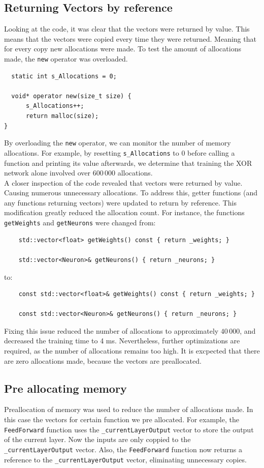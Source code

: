 \documentclass[twoside]{article}
\begin{document}
\subsection{Returning Vectors by reference}
Looking at the code, it was clear that the vectors were returned by value. This means that the vectors were copied every time they were returned.
Meaning that for every copy new allocations were made. To test the amount of allocations made, the \texttt{new} operator was overloaded.
\begin{lstlisting}
  static int s_Allocations = 0;

  void* operator new(size_t size) {
      s_Allocations++;
      return malloc(size);
}
\end{lstlisting}

By overloading the \texttt{new} operator, we can monitor the number of memory allocations.
For example, by resetting \texttt{s\_Allocations} to 0 before calling a function and printing its value afterwards,
we determine that training the XOR network alone involved over $600\,000$ allocations. \\

A closer inspection of the code revealed that vectors were returned by value.
Causing numerous unnecessary allocations. To address this,
getter functions (and any functions returning vectors) were updated to return by reference.
This modification greatly reduced the allocation count. For instance, the functions \texttt{getWeights} and \texttt{getNeurons} were changed from: \\
\begin{lstlisting}
    std::vector<float> getWeights() const { return _weights; }

    std::vector<Neuron>& getNeurons() { return _neurons; }
\end{lstlisting}
to:
\begin{lstlisting}
    const std::vector<float>& getWeights() const { return _weights; }

    const std::vector<Neuron>& getNeurons() { return _neurons; }
\end{lstlisting}
Fixing this issue reduced the number of allocations to approximately $40\,000$,
and decreased the training time to 4 ms. Nevertheless,
further optimizations are required, as the number of allocations remains too high.
It is excpected that there are zero allocations made, because the vectors are preallocated.

\subsection{Pre allocating memory}
Preallocation of memory was used to reduce the number of allocations made. In this case the vectors for certain function we pre allocated.
For example, the \texttt{FeedForward} function uses the \texttt{\_currentLayerOutput} vector to store the output of the current layer.
Now the inputs are only coppied to the \texttt{\_currentLayerOutput} vector.
Also, the \texttt{FeedForward} function now returns a reference to the \texttt{\_currentLayerOutput} vector, eliminating unnecessary copies. \\
\end{document}
